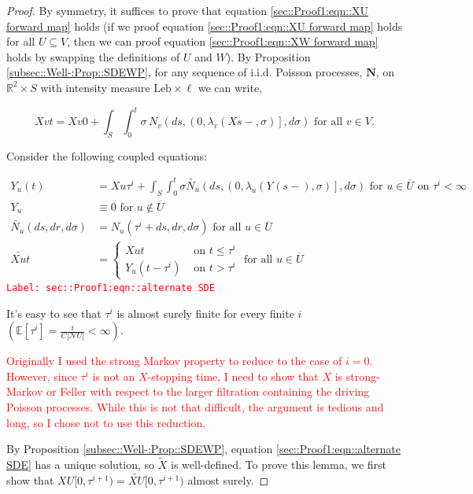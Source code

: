 \documentclass[12pt]{article}
\newcommand{\mb}{\mathbb}
\newcommand{\mc}{\mathcal}
\newcommand{\ov}{\overline}
\newcommand{\te}{\text}
\newcommand{\tr}{\textcolor{red}}
\newcommand{\labe}[1]{\tr{\texttt{Label: #1}}}
\newcommand{\ind}{\hspace{24pt}}
\newcommand{\ex}[1]{\mb{E}\left[#1\right]}			%
\renewcommand{\v}{v}							%
\newcommand{\vv}{u}								%
\renewcommand{\U}{U}							%
\newcommand{\UU}{W}								%
\renewcommand{\S}{S}							%
\newcommand{\s}{\sigma}							%
\renewcommand{\t}{t}							%
\renewcommand{\tt}{s}							%
\newcommand{\X}{X}								%
\newcommand{\neigh}{\mc{N}}						%
\newcommand{\cl}{\ov}							%
\newcommand{\poiss}[1]{N_{#1}}						%
\newcommand{\poisses}{\mathbf{N}}				%
\newcommand{\leb}{\te{Leb}}							%
\renewcommand{\r}{r}								%
\newcommand{\rt}[1]{\tau^{#1}}						%
\newcommand{\itt}{i}								%
\newcommand{\rxvtt}[2]{Y_{#1}{(#2)}}				%
\newcommand{\rxvtts}[2]{Y_{#1}{#2}}					%
\newcommand{\rate}[1]{\lambda_{#1}}					%
\newcommand{\const}[1]{C_{#1}}						%
\newcommand{\Sm}{\ell}								%
\newcommand{\alt}{\widetilde}						%
\begin{document}
\begin{proof}
By symmetry, it suffices to prove that equation \ref{sec::Proof1:eqn::XU forward map} holds (if we proof equation \eqref{sec::Proof1:eqn::XU forward map} holds for all \(\U \subseteq  V\), then we can proof equation \eqref{sec::Proof1:eqn::XW forward map} holds by swapping the definitions of \(\U\) and \(\UU\)). By Proposition \ref{subsec::Well-:Prop::SDEWP}, for any sequence of i.i.d. Poisson processes, \(\poisses\), on \(\mb{R}^2\times \S\) with intensity measure \(\leb\times\Sm\) we can write,

\[\X{\v}{\t} = \X{\v}{0} + \int_\S\int_0^\t \s\,\poiss{\v}\left(d\tt,\left(0,\rate{\v}(\X{}{\tt-},\s)\right],d\s\right)\te{ for all } \v\in  V.\]

Consider the following coupled equations:

\begin{align}
\rxvtt{\vv}{\t} &= \X{\vv}{\rt{\itt}} + \int_\S\int_0^\t \s\alt{\poiss{\vv}}\left(d\tt,\left(0,\rate{\vv}(\rxvtt{}{\tt-},\s)\right],d\s\right)\te{ for } \vv \in \cl{\U} \te{ on } \rt{\itt} < \infty \label{sec::Proof1:eqn::alternate SDE}\\
\rxvtts{\vv}{} &\equiv 0\te{ for } \vv\notin \cl{\U}\nonumber\\
\alt{\poiss{\vv}}(d\tt,d\r,d\s) &= \poiss{\vv}(\rt{\itt} + d\tt,d\r,d\s) \te{ for all }\vv\in \cl{\U}\nonumber\\
\alt{\X{\vv}{\t}} &= \begin{cases}
\X{\vv}{\t} &\te{ on } \t \leq \rt{\itt}\\
\rxvtt{\vv}{\t - \rt{\itt}} &\te{ on } \t > \rt{\itt}
\end{cases} \te{ for all } \vv\in \cl{\U} \nonumber
\end{align}
\labe{sec::Proof1:eqn::alternate SDE}

It's easy to see that \(\rt{\itt}\) is almost surely finite for every finite \(\itt\) \(\left(\ex{\rt{\itt}} = \frac{\itt}{\const{}|\neigh{\U}|} < \infty\right)\). 

\ind \tr{Originally I used the strong Markov property to reduce to the case of \(\itt = 0\). However, since \(\rt{\itt}\) is not an \(\X{}{}\)-stopping time, I need to show that \(\X{}{}\) is strong-Markov or Feller with respect to the larger filtration containing the driving Poisson processes. While this is not that difficult, the argument is tedious and long, so I chose not to use this reduction.}

\ind By Proposition \ref{subsec::Well-:Prop::SDEWP}, equation \eqref{sec::Proof1:eqn::alternate SDE} has a unique solution, so \(\alt{\X{}{}}\) is well-defined. To prove this lemma, we first show that \(\X{\U}{[0,\rt{\itt+1})} = \alt{\X{\U}{}}{[0,\rt{\itt+1})}\) almost surely. 


\end{proof}
\end{document}
